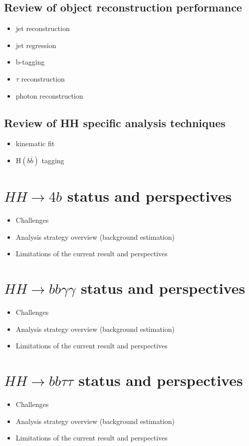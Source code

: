 \documentclass{book}
\begin{document}
\subsection{Review of object reconstruction performance}
\begin{itemize}
\item jet reconstruction  
\item jet regression 
\item b-tagging 
\item $\tau$ reconstruction
\item photon reconstruction

\end{itemize}
\subsection{Review of HH specific analysis techniques}
\begin{itemize}
\item kinematic fit
\item H$(b\bar{b})$ tagging
\end{itemize}
\section{$HH \to 4b$ status and perspectives}
\begin{itemize}
\item Challenges
\item Analysis strategy overview (background estimation)
\item Limitations of the current result and perspectives
\end{itemize}
\section{$HH \to bb\gamma\gamma$ status and perspectives}
\begin{itemize}
\item Challenges
\item Analysis strategy overview (background estimation)
\item Limitations of the current result and perspectives
\end{itemize}
\section{$HH \to bb\tau\tau$ status and perspectives}
\begin{itemize}
\item Challenges
\item Analysis strategy overview (background estimation)
\item Limitations of the current result and perspectives
\end{itemize}
\end{document}
